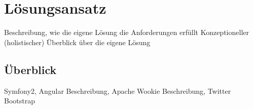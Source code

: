 \chapter{Lösungsansatz} 
\label{Kapitel 5}
Beschreibung, wie die eigene Lösung die Anforderungen erfüllt
Konzeptioneller (holistischer) Überblick über die eigene Lösung

\section{Überblick}


Symfony2, Angular Beschreibung, Apache Wookie Beschreibung, Twitter Bootstrap

